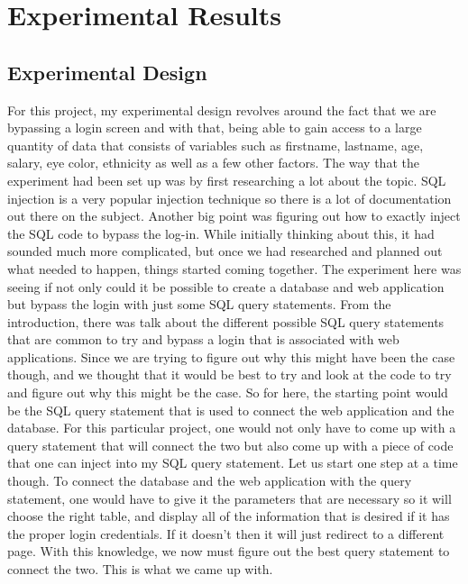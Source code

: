 \chapter{Experimental Results}
\label{ch:experiments}

\section{Experimental Design}

For this project, my experimental design revolves around the fact that we are bypassing
a login screen and with that, being able to gain access to a large quantity of data that
consists of variables such as firstname, lastname, age, salary, eye color, ethnicity
as well as a few other factors. The way that the experiment had been set up was by first
researching a lot about the topic. SQL injection is a very popular injection technique
so there is a lot of documentation out there on the subject. Another big point was figuring out how to exactly inject the SQL code to
bypass the log-in. While initially thinking about this, it had sounded much more
complicated, but once we had researched and planned out what needed to happen, things
started coming together. The experiment here was seeing if not only could it be possible to create a database and web application but bypass
the login with just some SQL query statements. From the introduction, there was talk about
the different possible SQL query statements that are common to try and bypass a login
that is associated with web applications. Since we are trying to figure out why this
might have been the case though, and we thought that it would be best to try and look at the code to try and figure out
why this might be the case. So for here, the starting point would be the SQL
query statement that is used to connect the web application and the database. For this
particular project, one would not only have to come up with a query statement that will connect
the two but also come up with a piece of code that one can inject into my SQL query statement.
Let us start one step at a time though. To connect the database and the web application
with the query statement, one would have to give it the parameters that are necessary so it will choose
the right table, and display all of the information that is desired if it has the proper
login credentials. If it doesn't then it will just redirect to a different page. With this
knowledge, we now must figure out the best query statement to connect the two. This
is what we came up with.


